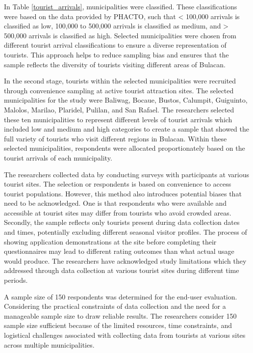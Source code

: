In Table \ref{tourist_arrivals}, municipalities were classified. These classifications were based on the data provided by PHACTO, such that < 100,000 arrivals is classified as low, 100,000 to 500,000 arrivals is classified as medium, and > 500,000 arrivals is classified as high. Selected municipalities were chosen from different tourist arrival classifications to ensure a diverse representation of tourists. This approach helps to reduce sampling bias and ensures that the sample reflects the diversity of tourists visiting different areas of Bulacan.

In the second stage, tourists within the selected municipalities were recruited through convenience sampling at active tourist attraction sites. The selected municipalities for the study were Baliwag, Bocaue, Bustos, Calumpit, Guiguinto, Malolos, Marilao, Plaridel, Pulilan, and San Rafael. The researchers selected these ten municipalities to represent different levels of tourist arrivals which included low and medium and high categories to create a sample that showed the full variety of tourists who visit different regions in Bulacan. Within these selected municipalities, respondents were allocated proportionately based on the tourist arrivals of each municipality. %

The researchers collected data by conducting surveys with participants at various tourist sites. The selection or respondents is based on convenience to access tourist populations. However, this method also introduces potential biases that need to be acknowledged. One is that respondents who were available and accessible at tourist sites may differ from tourists who avoid crowded areas. Secondly, the sample reflects only tourists present during data collection dates and times, potentially excluding different seasonal visitor profiles. The process of showing application demonstrations at the site before completing their questionnaires may lead to different rating outcomes than what actual usage would produce. The researchers have acknowledged study limitations which they addressed through data collection at various tourist sites during different time periods.

A sample size of 150 respondents was determined for the end-user evaluation. Considering the practical constraints of data collection and the need for a manageable sample size to draw reliable results. The researchers consider 150 sample size sufficient because of the limited resources, time constraints, and logistical challenges associated with collecting data from tourists at various sites across multiple municipalities. 

